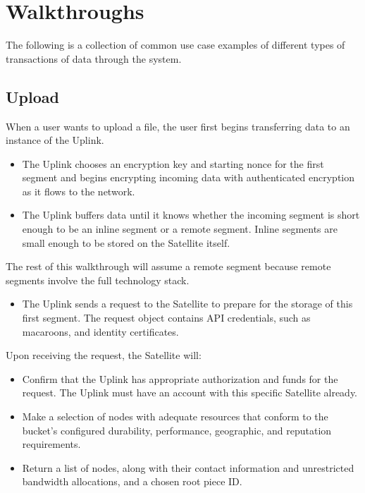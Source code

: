 \documentclass[8pt,fleqn,openany]{book}
\begin{document}
\chapter{Walkthroughs}\label{chap:walkthroughs}

The following is a collection of common use case examples of different types of
transactions of data through the system.

\section{Upload}

When a user wants to upload a file, the user first begins transferring data to
an instance of the Uplink.

\begin{itemize}
\item The Uplink chooses an encryption key and starting nonce for
  the first segment and begins encrypting incoming data with authenticated
  encryption as it flows to the network.
\item The Uplink buffers data until it knows whether the incoming segment is
short enough to be an inline segment or a remote segment. Inline segments are
small enough to be stored on the Satellite itself.
\end{itemize}

The rest of this
walkthrough will assume a remote segment because remote segments involve the
full technology stack.
\begin{itemize}
    \item The Uplink sends a request to the Satellite to prepare for the storage
of this first segment. The request object contains API credentials, such as
macaroons, and identity certificates.
\end{itemize}

Upon receiving the request, the Satellite will:
\begin{itemize}
\item Confirm that the Uplink has appropriate authorization and funds for
  the request. The Uplink must have an account with this specific Satellite
  already.
\item Make a selection of nodes with adequate resources that conform to the
  bucket's configured durability, performance, geographic, and reputation
  requirements.
\item Return a list of nodes, along with their contact information and
  unrestricted bandwidth allocations, and a chosen root piece ID.
\end{itemize}
\end{document}
